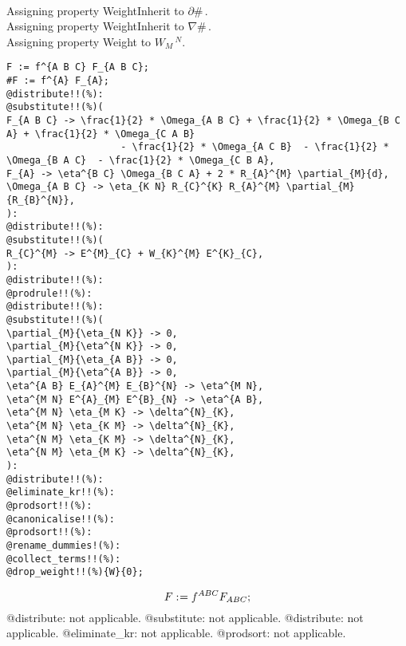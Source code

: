 \documentclass[11pt]{article}
\def\specialcolon{\mathrel{\mathop{:}}\hspace{-.5em}}
\begin{document}
\\
Assigning property WeightInherit to $\partial{\#}\, $.
\\
Assigning property WeightInherit to $\nabla{\#}\, $.
\\
Assigning property Weight to ${W}_{M}\,^{N}$.
\\
{\color[named]{Blue}\begin{verbatim}
F := f^{A B C} F_{A B C};
#F := f^{A} F_{A};
@distribute!!(%):
@substitute!!(%)(
F_{A B C} -> \frac{1}{2} * \Omega_{A B C} + \frac{1}{2} * \Omega_{B C A} + \frac{1}{2} * \Omega_{C A B}
                    - \frac{1}{2} * \Omega_{A C B}  - \frac{1}{2} * \Omega_{B A C}  - \frac{1}{2} * \Omega_{C B A},
F_{A} -> \eta^{B C} \Omega_{B C A} + 2 * R_{A}^{M} \partial_{M}{d},
\Omega_{A B C} -> \eta_{K N} R_{C}^{K} R_{A}^{M} \partial_{M}{R_{B}^{N}},
):
@distribute!!(%):
@substitute!!(%)(
R_{C}^{M} -> E^{M}_{C} + W_{K}^{M} E^{K}_{C},
):
@distribute!!(%):
@prodrule!!(%):
@distribute!!(%):
@substitute!!(%)(
\partial_{M}{\eta_{N K}} -> 0,
\partial_{M}{\eta^{N K}} -> 0,
\partial_{M}{\eta_{A B}} -> 0,
\partial_{M}{\eta^{A B}} -> 0,
\eta^{A B} E_{A}^{M} E_{B}^{N} -> \eta^{M N},
\eta^{M N} E^{A}_{M} E^{B}_{N} -> \eta^{A B},
\eta^{M N} \eta_{M K} -> \delta^{N}_{K},
\eta^{M N} \eta_{K M} -> \delta^{N}_{K},
\eta^{N M} \eta_{K M} -> \delta^{N}_{K},
\eta^{N M} \eta_{M K} -> \delta^{N}_{K},
):
@distribute!!(%):
@eliminate_kr!!(%):
@prodsort!!(%):
@canonicalise!!(%):
@prodsort!!(%):
@rename_dummies!(%):
@collect_terms!!(%):
@drop_weight!!(%){W}{0};
\end{verbatim}}
\begin{dmath*}[compact, spread=2pt]
F\specialcolon{}= {f}^{A B C} {F}_{A B C};
\end{dmath*}
@distribute: not applicable.
@substitute: not applicable.
@distribute: not applicable.
@eliminate\_kr: not applicable.
@prodsort: not applicable.
\end{document}
